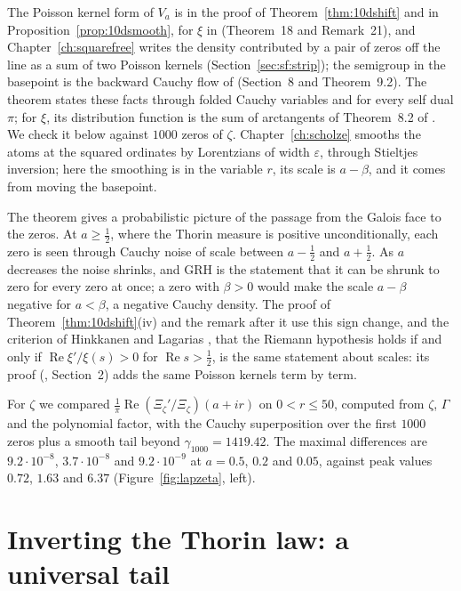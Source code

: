 The Poisson kernel form of $V_a$ is in the proof of Theorem~\ref{thm:10dshift} and in Proposition~\ref{prop:10dsmooth}, for $\xi$ in \cite{polson2018vdp} (Theorem~18 and Remark~21), and Chapter~\ref{ch:squarefree} writes the density contributed by a pair of zeros off the line as a sum of two Poisson kernels (Section~\ref{sec:sf:strip}); the semigroup in the basepoint is the backward Cauchy flow of \cite{polson2017} (Section~8 and Theorem~9.2). The theorem states these facts through folded Cauchy variables and for every self dual $\pi$; for $\xi$, its distribution function is the sum of arctangents of Theorem~8.2 of \cite{polson2017}. We check it below against $1000$ zeros of $\zeta$. Chapter~\ref{ch:scholze} smooths the atoms at the squared ordinates by Lorentzians of width $\varepsilon$, through Stieltjes inversion; here the smoothing is in the variable $r$, its scale is $a-\beta$, and it comes from moving the basepoint.

The theorem gives a probabilistic picture of the passage from the Galois face to the zeros. At $a\ge\frac12$, where the Thorin measure is positive unconditionally, each zero is seen through Cauchy noise of scale between $a-\frac12$ and $a+\frac12$. As $a$ decreases the noise shrinks, and GRH is the statement that it can be shrunk to zero for every zero at once; a zero with $\beta>0$ would make the scale $a-\beta$ negative for $a<\beta$, a negative Cauchy density. The proof of Theorem~\ref{thm:10dshift}(iv) and the remark after it use this sign change, and the criterion of Hinkkanen and Lagarias \cite{hinkkanen1997,lagarias1999}, that the Riemann hypothesis holds if and only if $\operatorname{Re}\xi'/\xi(s)>0$ for $\operatorname{Re}s>\frac12$, is the same statement about scales: its proof (\cite{lagarias1999}, Section~2) adds the same Poisson kernels term by term.

For $\zeta$ we compared $\frac1\pi\operatorname{Re}(\Xi_\zeta'/\Xi_\zeta)(a+ir)$ on $0<r\le50$, computed from $\zeta$, $\Gamma$ and the polynomial factor, with the Cauchy superposition over the first $1000$ zeros plus a smooth tail beyond $\gamma_{1000}=1419.42$. The maximal differences are $9.2\cdot10^{-8}$, $3.7\cdot10^{-8}$ and $9.2\cdot10^{-9}$ at $a=0.5$, $0.2$ and $0.05$, against peak values $0.72$, $1.63$ and $6.37$ (Figure~\ref{fig:lapzeta}, left).

\section{Inverting the Thorin law: a universal tail}\label{sec:laptail}


